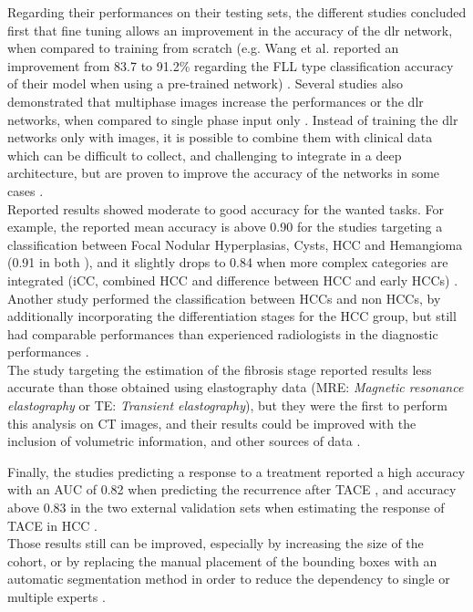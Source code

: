 Regarding their performances on their testing sets, the different
studies concluded first that fine tuning allows an improvement in the
accuracy of the \ac{dlr} network, when compared to training from
scratch (e.g. Wang et al. reported an improvement from 83.7 to 91.2\%
regarding the FLL type classification accuracy of their model when using a
pre-trained network) \cite{Wang2018,Yamada2019}. Several studies also demonstrated that multiphase images
increase the performances or the \ac{dlr} networks, when compared to
single phase input only \cite{Yasaka2018}. Instead of
training the \ac{dlr} networks only with images, it is possible to
combine them with clinical data which can be difficult to collect, and
challenging to integrate in a deep architecture, but are proven to
improve the accuracy of the networks in some cases \cite{WANG2019}.\\
Reported results showed moderate to good accuracy for the wanted tasks.
For example, the reported mean accuracy is above 0.90 for the studies
targeting a classification between Focal Nodular Hyperplasias, Cysts,
HCC and Hemangioma (0.91 in both \cite{Liang2018,Wang2018}), and it slightly drops to 0.84 when more complex categories
are integrated (iCC, combined HCC and difference between HCC and early
HCCs) \cite{Yasaka2018a}. Another study performed the
classification between HCCs and non HCCs, by additionally incorporating
the differentiation stages for the HCC group, but still had comparable
performances than experienced radiologists in the diagnostic
performances \cite{Yamada2019}.\\
The study targeting the estimation of the fibrosis stage reported
results less accurate than those obtained using elastography data
(MRE: \emph{Magnetic resonance elastography} or TE: \emph{Transient
elastography}), but they were the first to perform this analysis on CT
images, and their results could be improved with the inclusion of
volumetric information, and other sources of data \cite{Yasaka2018a}.

Finally, the studies predicting a response to a treatment reported a
high accuracy with an AUC of 0.82 when predicting the recurrence after
TACE \cite{WANG2019}, and accuracy above 0.83 in the two
external validation sets when estimating the response of TACE in HCC
\cite{Peng2020}.\\
Those results still can be improved, especially by increasing the size
of the cohort, or by replacing the manual placement of the bounding
boxes with an automatic segmentation method in order to reduce the
dependency to single or multiple experts \cite{Yasaka2018a,Peng2020}.

